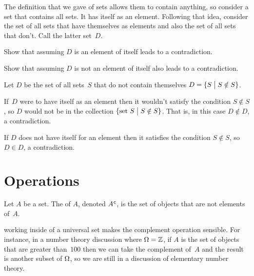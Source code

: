 \documentclass{ibl}  %
\begin{document}
\begin{ex} 
The definition that we gave of sets allows them to contain anything, so 
consider a set that contains all sets.
It has itself as an element.
Following that idea, 
consider the set of all sets that have themselves as elements and  
also the set of all sets that don't.
Call the latter set~$D$.
\begin{exes}
\item Show that assuming $D$ is an element of itself leads to a contradiction.
\item Show that assuming $D$ is not an element of itself also leads to a
contradiction.  
\end{exes}
\begin{ans}
Let $D$ be the set of all sets~$S$ that do not contain themselves
$D=\{S \bigm| S\notin S\}$.
\begin{exes}
\item If~$D$ were to have itself as an element 
  then it wouldn't satisfy the condition
  $S\notin S$, so $D$ would not be in the collection 
  $\{\text{set~$S$} \bigm| S\notin S\}$.
  That is, in this case $D\notin D$, a contradiction. 
\item If $D$ does not have itself for an element then it satisfies the
  condition $S\notin S$, so $D\in D$, a contradiction.
\end{exes}
\end{ans}
\end{ex}






\section{Operations}

\begin{df}
Let $A$ be a set.
The  of $A$, denoted ${A}^{\mspace{1mu}\mathsf{c}}$, is the 
set of objects that are not elements of~$A$.  
\end{df}

\noindent\remark
working inside of a universal set makes the complement
operation sensible. 
For instance, in a number theory discussion where $\Omega=\mathbb{Z}$, 
if $A$ is the set of objects that are greater than~$100$ then we can
take the complement of~$A$ and the result is another subset of 
$\Omega$, so 
we are still in a discussion of elementary number theory.
\end{document}
